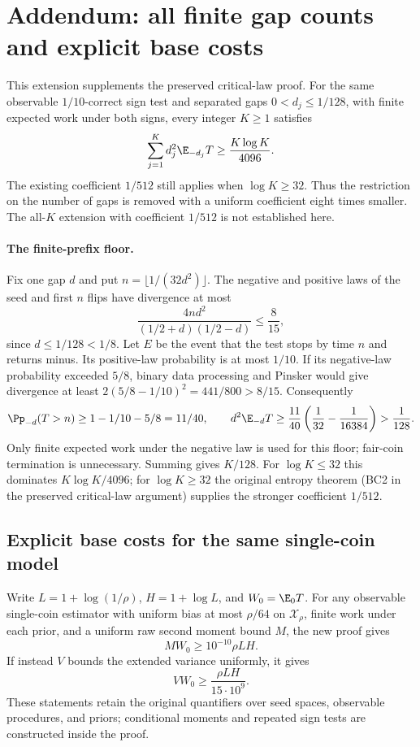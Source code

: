 \section*{Addendum: all finite gap counts and explicit base costs}
{}

This extension supplements the preserved critical-law proof. For the same
observable $1/10$-correct sign test and separated gaps $0<d_j\le1/128$,
with finite expected work under both signs, every integer $K\ge1$ satisfies
\[
 \sum_{j=1}^K d_j^2\E_{-d_j}T\ge\frac{K\log K}{4096}.
\]
The existing coefficient $1/512$ still applies when $\log K\ge32$.
Thus the restriction on the number of gaps is removed with a uniform
coefficient eight times smaller. The all-$K$ extension with coefficient
$1/512$ is not established here.

\paragraph{The finite-prefix floor.}
Fix one gap $d$ and put $n=\lfloor1/(32d^2)\rfloor$. The negative and
positive laws of the seed and first $n$ flips have divergence at most
\[
 \frac{4nd^2}{(1/2+d)(1/2-d)}\le\frac8{15},
\]
since $d\le1/128<1/8$. Let $E$ be the event that the test stops by time
$n$ and returns minus. Its positive-law probability is at most $1/10$.
If its negative-law probability exceeded $5/8$, binary data processing
and Pinsker would give divergence at least
$2(5/8-1/10)^2=441/800>8/15$. Consequently
\[
 \Pp_{-d}(T>n)\ge1-1/10-5/8=11/40,
 \qquad
 d^2\E_{-d}T\ge\frac{11}{40}\left(\frac1{32}-\frac1{16384}\right)
 >\frac1{128}.
\]
Only finite expected work under the negative law is used for this floor;
fair-coin termination is unnecessary. Summing gives $K/128$. For
$\log K\le32$ this dominates $K\log K/4096$; for $\log K\ge32$ the
original entropy theorem (BC2 in the preserved critical-law argument)
supplies the stronger coefficient $1/512$.

\subsection*{Explicit base costs for the same single-coin model}
{}
Write $L=1+\log(1/\rho)$, $H=1+\log L$, and $W_0=\E_0T$.
For any observable single-coin estimator with uniform bias at most
$\rho/64$ on $\mathcal X_\rho$, finite work under each prior, and a
uniform raw second moment bound $M$, the new proof gives
\[
 M W_0\ge 10^{-10}\rho LH.
\]
If instead $V$ bounds the extended variance uniformly, it gives
\[
 V W_0\ge\frac{\rho LH}{15\cdot10^9}.
\]
These statements retain the original quantifiers over seed spaces,
observable procedures, and priors; conditional moments and repeated
sign tests are constructed inside the proof.


